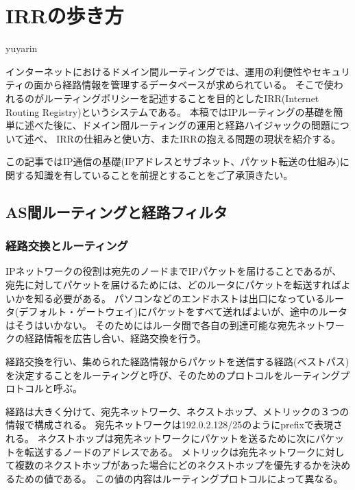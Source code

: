 
\chapter{IRRの歩き方}

\begin{flushright}
 {\headfont yuyarin} %
\end{flushright}

インターネットにおけるドメイン間ルーティングでは、運用の利便性やセキュリティの面から経路情報を管理するデータベースが求められている。
そこで使われるのがルーティングポリシーを記述することを目的としたIRR(Internet Routing Registry)というシステムである。
本稿ではIPルーティングの基礎を簡単に述べた後に、ドメイン間ルーティングの運用と経路ハイジャックの問題について述べ、
IRRの仕組みと使い方、またIRRの抱える問題の現状を紹介する。

この記事ではIP通信の基礎(IPアドレスとサブネット、パケット転送の仕組み)に関する知識を有していることを前提とすることをご了承頂きたい。


\section{AS間ルーティングと経路フィルタ}

\subsection{経路交換とルーティング}

IPネットワークの役割は宛先のノードまでIPパケットを届けることであるが、
宛先に対してパケットを届けるためには、どのルータにパケットを転送すればよいかを知る必要がある。
パソコンなどのエンドホストは出口になっているルータ(デフォルト・ゲートウェイ)にパケットをすべて送ればよいが、途中のルータはそうはいかない。
そのためにはルータ間で各自の到達可能な宛先ネットワークの経路情報を広告し合い、経路交換を行う。

経路交換を行い、集められた経路情報からパケットを送信する経路(ベストパス)を決定することをルーティングと呼び、そのためのプロトコルをルーティングプロトコルと呼ぶ。

経路は大きく分けて、宛先ネットワーク、ネクストホップ、メトリックの３つの情報で構成される。
宛先ネットワークは192.0.2.128/25のようにprefixで表現される。
ネクストホップは宛先ネットワークにパケットを送るために次にパケットを転送するノードのアドレスである。
メトリックは宛先ネットワークに対して複数のネクストホップがあった場合にどのネクストホップを優先するかを決めるための値である。
この値の内容はルーティングプロトコルによって異なる。

